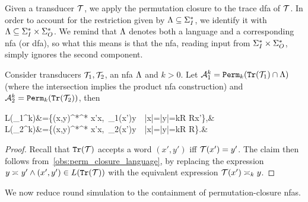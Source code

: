 Given a transducer $\cT$, we apply the permutation closure to the trace \gls{dfa} of $\cT$. In order to account for the restriction given by $\fL\subseteq \sI^*$, we identify it with $\fL \subseteq \sI^*\times \sO^*$. We remind that $\fL$ denotes both a language and a corresponding \gls{nfa} (or \gls{dfa}), so what this means is that the \gls{nfa}, reading input from $\sI^*\times \sO^*$, simply ignores the second component.
\begin{lemma}
	\label{lem:permutation_closure_construction}
	Consider transducers $\cT_1,\cT_2$, an \gls{nfa} $\fL$ and $k>0$. Let $\cA_1^k=\perm_k(\tr(\cT_1)\cap \fL)$ (where the intersection implies the product \gls{nfa} construction) and $\cA_2^k=\perm_k(\tr(\cT_2))$, then
	\begin{flalign*}
	L(\cA_1^k)&=\{(x,y)\in \sI^*\times \sO^* \ST \exists x'\req[k] x,\ \cT_1(x')\req[k] y\ \wedge\ |x|=|y|=kR R\in \bbN \wedge x'\in \fL\},&\\
	L(\cA_2^k)&=\{(x,y)\in \sI^*\times \sO^* \ST \exists x'\req[k] x,\ \cT_2(x')\req[k] y\ \wedge\ |x|=|y|=kR R\in \bbN\}.&
	\end{flalign*}
\end{lemma}
\begin{proof}
	Recall that $\tr(\cT)$ accepts a word $(x',y')$ iff $\cT(x')=y'$. The claim then follows from~\cref{obs:perm_closure_language}, by replacing the expression $y\req y' \wedge (x',y')\in L(\tr(\cT))$ with the equivalent expression $\cT(x')\req[k] y$.
\end{proof}

We now reduce round simulation to the containment of permutation-closure \glspl{nfa}.

